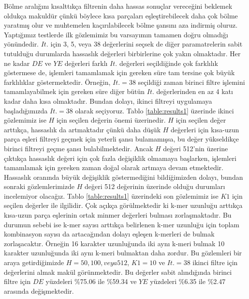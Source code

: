 Bölme aralığını kısalttıkça filtrenin daha hassas sonuçlar vereceğini beklemek oldukça makuldür çünkü böylece kısa parçaları eşleştirebilecek daha çok bölme yaratmış olur ve muhtemelen kaçırılabilecek bölme şansını aza indirmiş oluruz. Yaptığımız testlerde ilk gözlemimiz bu varsayımın tamamen doğru olmadığı yönündedir. $It.$ için 3, 5, veya 38 değerlerini seçsek de diğer paramatrelerin sabit tutulduğu durumlarda hassaslık değerleri birbirlerine çok yakın olmaktadır. Her ne kadar $DE$ ve $YE$ değerleri farklı $It.$ değerleri seçildiğinde çok farklılık göstermese de, işlemleri tamamlamak için gereken süre tam tersine çok büyük farklılıklar göstermektedir. Örneğin, $It. = 38$ seçildiği zaman birinci filtre işlemini tamamlayabilmek için gereken süre diğer bütün $It.$ değerlerinden en az 4 katı kadar daha kısa olmaktadır. Bundan dolayı, ikinci filtreyi uygulamaya başladığımızda $It. = 38$ olarak seçiyoruz. Tablo \ref{table:results1} üzerinde ikinci gözlemimiz ise $H$ için seçilen değerin önemi üzerinedir. $H$ için seçilen değer arttıkça, hassaslık da artmaktadır çünkü daha düşük $H$ değerleri için kısa-uzun parça eşleri filtreyi geçmek için yeterli şansı bulamamışsa, bu değer yükseldikçe birinci filtreyi geçme şansı bulabilmektedir. Ancak $H$ değeri 512'nin üzerine çıktıkça hassaslık değeri için çok fazla değişiklik olmamaya başlarken, işlemleri tamamlamak için gereken zaman doğal olarak artmaya devam etmektedir. Hassaslık oranında büyük değişiklik göstermediğini bildiğimizden dolayı, bundan sonraki gözlemlerimizde $H$ değeri 512 değerinin üzerinde olduğu durumları incelemiyor olacağız. Tablo \ref{table:results1} üzerindeki son gözlemimiz ise $K1$ için seçilen değerler ile ilgilidir. Çok açıkça görülmektedir ki k-mer uzunluğu arttıkça kısa-uzun parça eşlerinin ortak minmer değerleri bulması zorlaşmaktadır. Bu durumun sebebi ise k-mer sayısı arttıkça belirlenen k-mer uzunluğu için toplam kombinasyon sayısı da artacağından dolayı eşleşen k-merleri de bulmak zorlaşacaktır. Örneğin 16 karakter uzunluğunda iki aynı k-meri bulmak 10 karakter uzunluğunda iki aynı k-meri bulmaktan daha zordur. Bu gözlemleri bir araya getirdiğimizde $H = 50, 100, veya 512$, $K1 = 10$ ve $It. = 38$ ikinci filtre için değerlerini almak makül görünmektedir. Bu değerler sabit alındığında birinci filtre için $DE$ yüzdeleri \%75.06 ile \%59.34 ve $YE$ yüzdeleri \%6.35 ile \%2.47 arasında değişmektedir.

